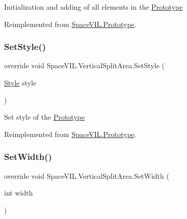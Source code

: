Initialization and adding of all elements in the \mbox{\hyperlink{class_space_v_i_l_1_1_prototype}{Prototype}} 



Reimplemented from \mbox{\hyperlink{class_space_v_i_l_1_1_prototype_ac3379fe02923ee155b5b0084abf27420}{Space\+V\+I\+L.\+Prototype}}.

\mbox{\label{class_space_v_i_l_1_1_vertical_split_area_a5911fe0a1fb51f9e14a4f3f31dac4ecd}} 
\subsubsection{\texorpdfstring{Set\+Style()}{SetStyle()}}
{\footnotesize\ttfamily override void Space\+V\+I\+L.\+Vertical\+Split\+Area.\+Set\+Style (\begin{DoxyParamCaption}\item[{\mbox{\hyperlink{class_space_v_i_l_1_1_decorations_1_1_style}{Style}}}]{style }\end{DoxyParamCaption})\hspace{0.3cm}{\ttfamily [virtual]}}



Set style of the \mbox{\hyperlink{class_space_v_i_l_1_1_prototype}{Prototype}} 



Reimplemented from \mbox{\hyperlink{class_space_v_i_l_1_1_prototype_ae96644a6ace490afb376fb542161e541}{Space\+V\+I\+L.\+Prototype}}.

\mbox{\label{class_space_v_i_l_1_1_vertical_split_area_a665c01c8beced7686b57b7f4d41f3b70}} 
\subsubsection{\texorpdfstring{Set\+Width()}{SetWidth()}}
{\footnotesize\ttfamily override void Space\+V\+I\+L.\+Vertical\+Split\+Area.\+Set\+Width (\begin{DoxyParamCaption}\item[{int}]{width }\end{DoxyParamCaption})\hspace{0.3cm}{\ttfamily [virtual]}}



